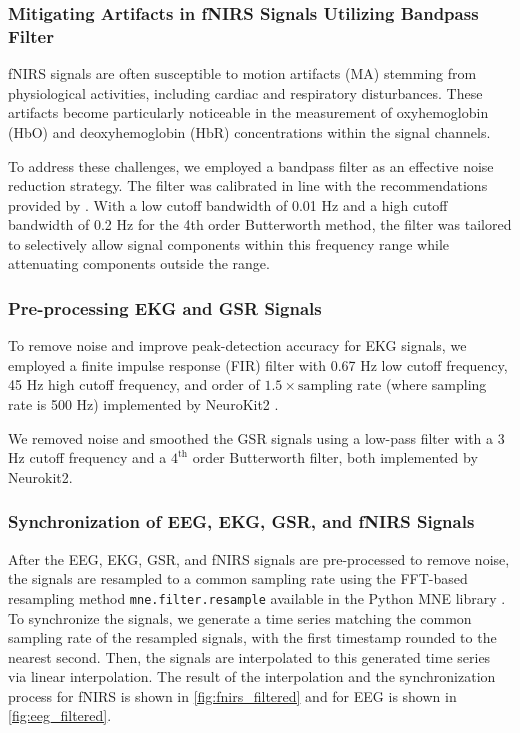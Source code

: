 \subsubsection{Mitigating Artifacts in fNIRS Signals Utilizing Bandpass Filter}

fNIRS signals are often susceptible to motion artifacts (MA) stemming from physiological activities, including cardiac and respiratory disturbances. These artifacts become particularly noticeable in the measurement of oxyhemoglobin (HbO) and deoxyhemoglobin (HbR) concentrations within the signal channels.

To address these challenges, we employed a bandpass filter as an effective noise reduction strategy. The filter was calibrated in line with the recommendations provided by \cite{Koenraadt2014}. With a low cutoff bandwidth of 0.01 Hz and a high cutoff bandwidth of 0.2 Hz for the 4th order Butterworth method, the filter was tailored to selectively allow signal components within this frequency range while attenuating components outside the range.

\subsubsection{Pre-processing EKG and GSR Signals}

To remove noise and improve peak-detection accuracy for EKG signals, we employed a finite impulse response (FIR) filter with 0.67 Hz low cutoff frequency, 45 Hz high cutoff frequency, and order of $1.5 \times \text{sampling rate}$ (where sampling rate is 500 Hz) implemented by NeuroKit2 \cite{Makowski2021neurokit}.

We removed noise and smoothed the GSR signals using a low-pass filter with a 3 Hz cutoff frequency and a $4^\text{th}$ order Butterworth filter, both implemented by Neurokit2.

\subsubsection{Synchronization of EEG, EKG, GSR, and fNIRS Signals}

After the EEG, EKG, GSR, and fNIRS signals are pre-processed to remove noise, the signals are resampled to a common sampling rate using the FFT-based resampling method \texttt{mne.filter.resample} available in the Python MNE library \cite{GramfortEtAl2013a}. To synchronize the signals, we generate a time series matching the common sampling rate of the resampled signals, with the first timestamp rounded to the nearest second. Then, the signals are interpolated to this generated time series via linear interpolation. The result of the interpolation and the synchronization process for fNIRS is shown in \autoref{fig:fnirs_filtered} and for EEG is shown in \autoref{fig:eeg_filtered}.

